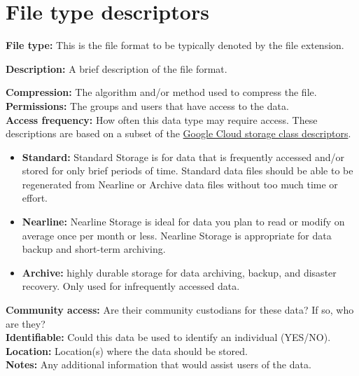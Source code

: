 \documentclass[
]{book}
\providecommand{\tightlist}{%
  \setlength{\itemsep}{0pt}\setlength{\parskip}{0pt}}
\begin{document}
\hypertarget{file-type-descriptors}{%
\section{File type descriptors}\label{file-type-descriptors}}

\textbf{File type:} This is the file format to be typically denoted by the file extension.

\textbf{Description:} A brief description of the file format.

\textbf{Compression:} The algorithm and/or method used to compress the file.\\

\textbf{Permissions:} The groups and users that have access to the data.\\

\textbf{Access frequency:} How often this data type may require access. These descriptions are based on a subset of the \href{https://cloud.google.com/storage/docs/storage-classes\#classes}{Google Cloud storage class descriptors}.

\begin{itemize}
\tightlist
\item
  \textbf{Standard:} Standard Storage is for data that is frequently accessed and/or stored for only brief periods of time. Standard data files should be able to be regenerated from Nearline or Archive data files without too much time or effort.
\item
  \textbf{Nearline:} Nearline Storage is ideal for data you plan to read or modify on average once per month or less. Nearline Storage is appropriate for data backup and short-term archiving.
\item
  \textbf{Archive:} highly durable storage for data archiving, backup, and disaster recovery. Only used for infrequently accessed data.
\end{itemize}

\textbf{Community access:} Are their community custodians for these data? If so, who are they?\\

\textbf{Identifiable:} Could this data be used to identify an individual (YES/NO).\\

\textbf{Location:} Location(s) where the data should be stored.\\

\textbf{Notes:} Any additional information that would assist users of the data.\\
\end{document}
